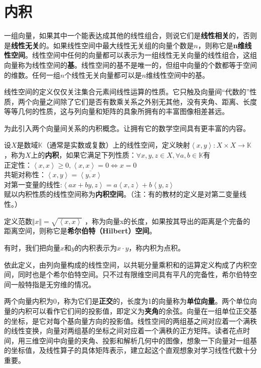\section{内积}
一组向量，如果其中一个能表达成其他的线性组合，则说它们是\textbf{线性相关}的，否则是\textbf{线性无关}的。如果线性空间中最大线性无关组的向量个数是$ n $，则称它是\textbf{n维线性空间}。线性空间中任何的向量都可以表示为一组线性无关向量的线性组合，这组向量称为线性空间的\textbf{基}。线性空间的基不是唯一的，但组中向量的个数都等于空间的维数。任何一组$ n $个线性无关向量都可以是$ n $维线性空间中的基。

线性空间的定义仅仅关注集合元素间线性运算的性质。它只触及向量间``代数的''性质，两个向量之间除了它们是否有数乘关系之外别无其他，没有夹角、距离、长度等等几何的性质，这与列向量和矩阵的具象所拥有的丰富图像相差甚远。

为此引入两个向量间关系的内积概念。让拥有它的数学空间具有更丰富的内容。

\kaishu

设$ X $是数域$ \mathbb{K} $（通常是实数或复数）上的线性空间，定义映射$ \left\langle x,y \right \rangle :X\times X\rightarrow \mathbb{K} $，称为$ X $上的\textbf{内积}，如果它满足下列性质：$ \forall x,y,z \in X, \forall a,b \in \mathbb{K} $有\\
正定性：$ \left\langle x,x\right \rangle \ge 0, \left \langle x,x \right \rangle = 0\Leftrightarrow x=0 $\\
共轭对称性：$ \left\langle x,y \right \rangle = \overline{\left \langle y,x \right \rangle} $\\
对第一变量的线性:$ \left\langle ax+by,z \right \rangle = a\left \langle x,z \right \rangle + b \left\langle y,z \right \rangle $\\
赋以内积性质的线性空间称为\textbf{内积空间}。（注：有的教材的定义是对第二变量线性。）

定义范数$ \Vert x \Vert = \sqrt{\left \langle x,x \right\rangle} $
，称为向量x的长度，如果按其导出的距离是个完备的距离空间，则称它是\textbf{希尔伯特（Hilbert）空间}。

\songti

有时，我们把向量$ x $和$ y $的内积表示为$ x \cdot y $，称内积为点积。

依此定义，由列向量构成的线性空间，以共轭分量乘积和的运算定义构成了内积空间，同时也是个希尔伯特空间。只不过有限维空间具有平凡的完备性，希尔伯特空间一般特指是无穷维的情况。

两个向量内积为0，称为它们是\textbf{正交}的，长度为1的向量称为\textbf{单位向量}。两个单位向量的内积可以看作它们间的投影值，即定义为\textbf{夹角}的余弦。向量在一组单位正交基的坐标，是它对每个基向量方向的投影值。线性空间的两组基之间对应着一个满秩的线性变换，向量对两组基的坐标之间对应着一个满秩的正方矩阵。读者花点时间，用三维空间中向量的夹角、投影和解析几何中的图像，想象一下向量对一组基的坐标值，及线性算子的具体矩阵表示，建立起这个直观想象对学习线性代数十分重要。

